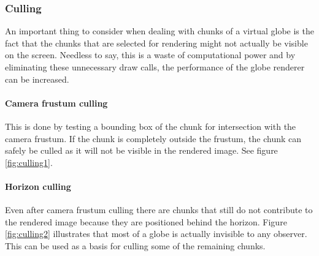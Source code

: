 \subsubsection{Culling}
An important thing to consider when dealing with chunks of a virtual globe is the fact that the chunks that are selected for rendering might not actually be visible on the screen. Needless to say, this is a waste of computational power and by eliminating these unnecessary draw calls, the performance of the globe renderer can be increased.

\paragraph{Camera frustum culling} This is done by testing a bounding box of the chunk for intersection with the camera frustum. If the chunk is completely outside the frustum, the chunk can safely be culled as it will not be visible in the rendered image. See figure \ref{fig:culling1}.

\paragraph{Horizon culling} Even after camera frustum culling there are chunks that still do not contribute to the rendered image because they are positioned behind the horizon. Figure \ref{fig:culling2} illustrates that most of a globe is actually invisible to any observer. This can be used as a basis for culling some of the remaining chunks. 

